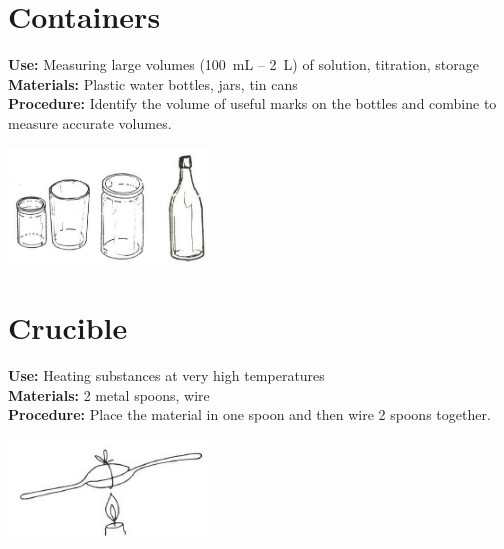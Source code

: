 \begin{multicols}{2}
\section{Containers}
\label{sec:containers}
\vspace{-10pt}
\textbf{Use:} Measuring large volumes (100~mL -- 2~L) of solution, titration, storage\\
\textbf{Materials:} Plastic water bottles, jars, tin cans\\
\textbf{Procedure:} Identify the volume of useful marks on the bottles 
and combine to measure accurate volumes.
\begin{center}
\includegraphics[width=0.4\textwidth]{./img/source/volumetric.jpg}
\end{center}

\section{Crucible}
\label{sec:crucible}
\vspace{-10pt}
\textbf{Use:} Heating substances at very high temperatures\\
\textbf{Materials:} 2 metal spoons, wire\\
\textbf{Procedure:} Place the material in one spoon and then wire 2 spoons together.
\begin{center}
\includegraphics[width=0.4\textwidth]{./img/vso/crucible.jpg}
\end{center}


\end{multicols}
